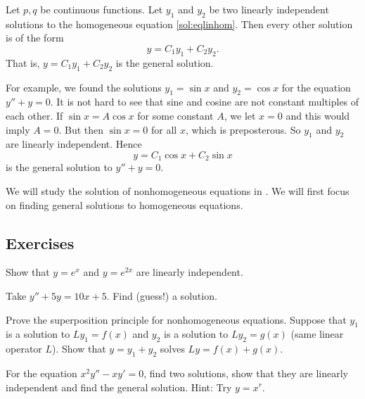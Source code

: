 \begin{theorem}
Let $p, q$ be continuous functions.
Let $y_1$ and $y_2$ be two linearly independent
solutions to the homogeneous equation \eqref{sol:eqlinhom}. 
Then every other solution is 
of the form
\begin{equation*}
y = C_1 y_1 + C_2 y_2 .
\end{equation*}
That is, $y = C_1 y_1 + C_2 y_2$ is the general solution.
\end{theorem}

For example, we found the solutions
$y_1 = \sin x$ and $y_2 = \cos x$ for the
equation $y'' + y = 0$.  It is not hard to see that sine and cosine are not
constant
multiples of each other.  If $\sin x = A \cos x$ for some constant $A$,
we let $x=0$ and this would imply $A = 0$.  But then $\sin x = 0$ for all
$x$, which is preposterous.
So $y_1$ and $y_2$ are linearly independent.  Hence
\begin{equation*}
y = C_1 \cos x + C_2 \sin x 
\end{equation*}
is the general solution to $y'' + y = 0$.

\medskip

We will study the solution of nonhomogeneous equations in
.  We will first focus on finding general solutions to
homogeneous equations.

\subsection{Exercises}

\begin{exercise}
Show that $y=e^x$ and $y=e^{2x}$ are linearly independent.
\end{exercise}

\begin{exercise}
Take $y'' + 5 y = 10 x + 5$.  Find (guess!) a solution.
\end{exercise}

\begin{exercise}
Prove the superposition principle for nonhomogeneous equations.  Suppose that
$y_1$ is a solution to $L y_1 = f(x)$ and $y_2$ is a solution to
$L y_2 = g(x)$ (same linear operator $L$).  Show that $y = y_1+y_2$ solves
$Ly = f(x) + g(x)$.
\end{exercise}

\begin{exercise}
For the equation $x^2 y'' - x y' = 0$, find two solutions, show that they
are linearly independent and find the general solution.
Hint: Try $y = x^r$.
\end{exercise}

